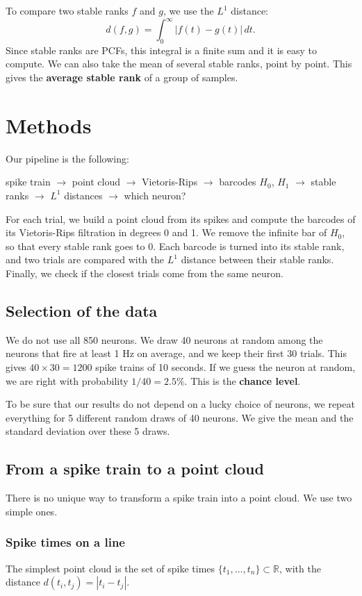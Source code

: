 \documentclass[11pt,a4paper]{article}
\begin{document}
To compare two stable ranks $f$ and $g$, we use the $L^1$ distance:
\[
    d(f,g) = \int_0^\infty |f(t) - g(t)|\, dt .
\]
Since stable ranks are PCFs, this integral is a finite sum and it is easy to compute. We can also take the mean of several stable ranks, point by point. This gives the \textbf{average stable rank} of a group of samples.


\section{Methods}
\label{sec:methods}

Our pipeline is the following:
\begin{center}
    spike train $\rightarrow$ point cloud $\rightarrow$ Vietoris-Rips $\rightarrow$ barcodes $H_0$, $H_1$ $\rightarrow$ stable ranks $\rightarrow$ $L^1$ distances $\rightarrow$ which neuron?
\end{center}
For each trial, we build a point cloud from its spikes and compute the barcodes of its Vietoris-Rips filtration in degrees 0 and 1. We remove the infinite bar of $H_0$, so that every stable rank goes to 0. Each barcode is turned into its stable rank, and two trials are compared with the $L^1$ distance between their stable ranks. Finally, we check if the closest trials come from the same neuron.

\subsection{Selection of the data}
We do not use all 850 neurons. We draw 40 neurons at random among the neurons that fire at least 1 Hz on average, and we keep their first 30 trials. This gives $40 \times 30 = 1200$ spike trains of 10 seconds. If we guess the neuron at random, we are right with probability $1/40 = 2.5\%$. This is the \textbf{chance level}.

To be sure that our results do not depend on a lucky choice of neurons, we repeat everything for 5 different random draws of 40 neurons. We give the mean and the standard deviation over these 5 draws.

\subsection{From a spike train to a point cloud}
There is no unique way to transform a spike train into a point cloud. We use two simple ones.

\subsubsection{Spike times on a line}
The simplest point cloud is the set of spike times $\{t_1, \dots, t_n\} \subset \mathbb{R}$, with the distance $d(t_i,t_j)=|t_i-t_j|$.
\end{document}
